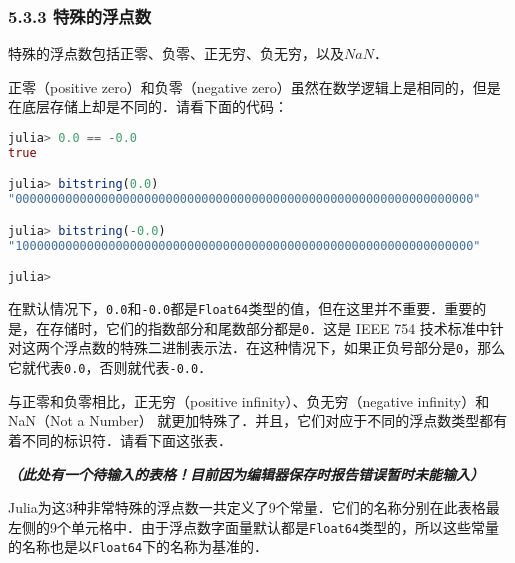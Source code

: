 \subsubsection{5.3.3 特殊的浮点数}

特殊的浮点数包括正零、负零、正无穷、负无穷，以及$NaN$．

正零（positive zero）和负零（negative zero）虽然在数学逻辑上是相同的，但是在底层存储上却是不同的．请看下面的代码：
\begin{lstlisting}[language=julia]
julia> 0.0 == -0.0 
true

julia> bitstring(0.0)
"0000000000000000000000000000000000000000000000000000000000000000"

julia> bitstring(-0.0)
"1000000000000000000000000000000000000000000000000000000000000000"

julia> 
\end{lstlisting}

在默认情况下，\verb|0.0|和\verb|-0.0|都是\verb|Float64|类型的值，但在这里并不重要．重要的是，在存储时，它们的指数部分和尾数部分都是\verb|0|．这是 IEEE 754 技术标准中针对这两个浮点数的特殊二进制表示法．在这种情况下，如果正负号部分是\verb|0|，那么它就代表\verb|0.0|，否则就代表\verb|-0.0|．

与正零和负零相比，正无穷（positive infinity）、负无穷（negative infinity）和 NaN（Not a Number） 就更加特殊了．并且，它们对应于不同的浮点数类型都有着不同的标识符．请看下面这张表．

\textsl{\textbf{（此处有一个待输入的表格！目前因为编辑器保存时报告错误暂时未能输入）}}


Julia为这3种非常特殊的浮点数一共定义了9个常量．它们的名称分别在此表格最左侧的9个单元格中．由于浮点数字面量默认都是\verb|Float64|类型的，所以这些常量的名称也是以\verb|Float64|下的名称为基准的．

